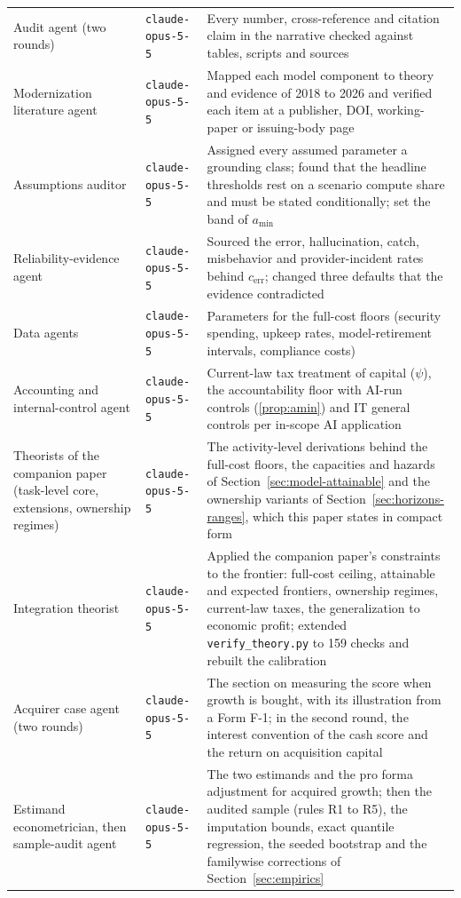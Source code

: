 {\begin{longtable}{@{}p{}p{}p{}@{}}
Audit agent (two rounds) & \texttt{claude-opus-5-5} & Every number, cross-reference and citation claim in the narrative checked against tables, scripts and sources\\
Modernization literature agent & \texttt{claude-opus-5-5} & Mapped each model component to theory and evidence of 2018 to 2026 and verified each item at a publisher, DOI, working-paper or issuing-body page\\
Assumptions auditor & \texttt{claude-opus-5-5} & Assigned every assumed parameter a grounding class; found that the headline thresholds rest on a scenario compute share and must be stated conditionally; set the band of $a_{\min}$\\
Reliability-evidence agent & \texttt{claude-opus-5-5} & Sourced the error, hallucination, catch, misbehavior and provider-incident rates behind $c_{\mathrm{err}}$; changed three defaults that the evidence contradicted\\
Data agents & \texttt{claude-opus-5-5} & Parameters for the full-cost floors (security spending, upkeep rates, model-retirement intervals, compliance costs)\\
Accounting and internal-control agent & \texttt{claude-opus-5-5} & Current-law tax treatment of capital ($\psi$), the accountability floor with AI-run controls (\autoref{prop:amin}) and IT general controls per in-scope AI application\\
Theorists of the companion paper (task-level core, extensions, ownership regimes) & \texttt{claude-opus-5-5} & The activity-level derivations behind the full-cost floors, the capacities and hazards of Section~\ref{sec:model-attainable} and the ownership variants of Section~\ref{sec:horizons-ranges}, which this paper states in compact form\\
Integration theorist & \texttt{claude-opus-5-5} & Applied the companion paper's constraints to the frontier: full-cost ceiling, attainable and expected frontiers, ownership regimes, current-law taxes, the generalization to economic profit; extended \texttt{verify\_theory.py} to 159 checks and rebuilt the calibration\\
Acquirer case agent (two rounds) & \texttt{claude-opus-5-5} & The section on measuring the score when growth is bought, with its illustration from a Form F-1; in the second round, the interest convention of the cash score and the return on acquisition capital\\
Estimand econometrician, then sample-audit agent & \texttt{claude-opus-5-5} & The two estimands and the pro forma adjustment for acquired growth; then the audited sample (rules R1 to R5), the imputation bounds, exact quantile regression, the seeded bootstrap and the familywise corrections of Section~\ref{sec:empirics}\\

\end{longtable}}
